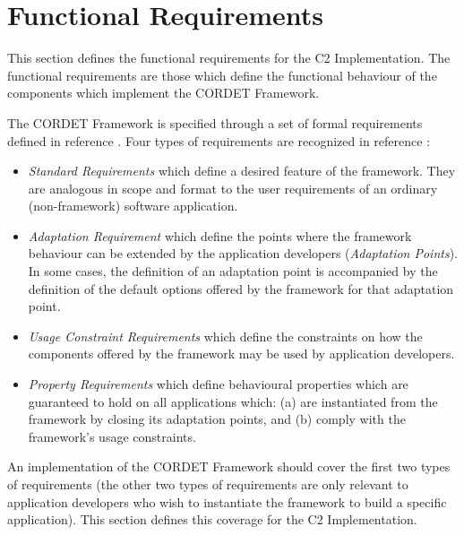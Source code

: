 \documentclass{pnp_article}
\begin{document}
\section{Functional Requirements}\label{sec:fncReqs}
This section defines the functional requirements for the C2 Implementation. The functional requirements are those which define the functional behaviour of the components which implement the CORDET Framework.

\label{req:ImplCrReq}

The CORDET Framework is specified through a set of formal requirements defined in reference \cite{ref:cordetfw}. Four types of requirements are recognized in reference \cite{ref:cordetfw}: 

\begin{itemize}
\item{} \textit{Standard Requirements} which define a desired feature of the framework. They are analogous in scope and format to the user requirements of an ordinary (non-framework) software application.
\item{} \textit{Adaptation Requirement} which define the points where the framework behaviour can be extended by the application developers (\textit{Adaptation Points}). In some cases, the definition of an adaptation point is accompanied by the definition of the default options offered by the framework for that adaptation point.  
\item{} \textit{Usage Constraint Requirements} which define the constraints on how the components offered by the framework may be used by application developers.
\item{} \textit{Property Requirements} which define behavioural properties which are guaranteed to hold on all applications which: (a) are instantiated from the framework by closing its adaptation points, and (b) comply with the framework's usage constraints.
\end{itemize}

An implementation of the CORDET Framework should cover the first two types of requirements (the other two types of requirements are only relevant to application developers who wish to instantiate the framework to build a specific application). This section defines this coverage for the C2 Implementation.
\end{document}
